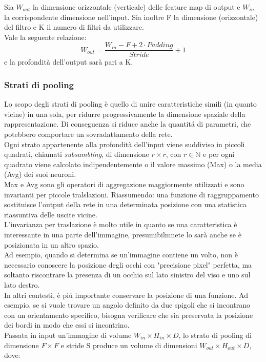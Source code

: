 \documentclass[a4paper,12pt]{report}
\begin{document}
Sia $W_{out}$ la dimensione orizzontale (verticale) delle feature map di output e $W_{in}$ la corrispondente dimensione nell'input. Sia inoltre F la dimensione (orizzontale) del filtro e K il numero di filtri da utilizzare.\\
Vale la seguente relazione:
\begin{equation}
W_{out}=\frac{W_{in} -F+2\cdot Padding}{Stride}+1
\end{equation}
e la profondit\`{a} dell'output sar\`{a} pari a K.
\newpage
\subsubsection{Strati di pooling}
Lo scopo degli strati di pooling \`e quello di unire caratteristiche simili (in quanto vicine) in una sola, per ridurre progressivamente la dimensione spaziale della rappresentazione. Di conseguenza si riduce anche la quantit\'{a} di parametri, che potebbero comportare un sovradattamento della rete.\\
Ogni strato appartenente alla profondit\`{a} dell'input viene suddiviso in piccoli quadrati, chiamati \textit{subsambling}, di dimensione  $r \times r$, con $r\in \mathbb{N}$ e  per ogni quadrato viene calcolato indipendentemente o il valore massimo (Max) o  la media (Avg) dei suoi neuroni.\\
Max e Avg sono gli operatori di aggregazione maggiormente utilizzati e sono invarianti per piccole tralslazioni. Riassumendo: una funzione di raggruppamento sostituisce l'output della rete in una determinata posizione con una statistica riassuntiva delle uscite vicine.\\
L'invarianza per traslazione \`e molto utile in quanto se una caratteristica \`e interessante in una parte dell'immagine, presumibilmnete lo sar\`{a} anche se \`e posizionata in un altro spazio.\\
Ad esempio, quando si determina se un'immagine contiene un volto, non \`e necessario conoscere la posizione degli occhi con "precisione pixel" perfetta, ma soltanto riscontrare la presenza di un occhio sul lato sinistro del viso e uno sul lato destro.\\
In altri contesti, \`e pi\'{u} importante conservare la posizione di una funzione. Ad esempio, se si vuole trovare un angolo definito da due spigoli che si incontrano con un orientamento specifico, bisogna verificare che sia preservata la posizione dei bordi in modo che essi si incontrino.\\
Passata in input un'immagine di volume $W_{in} \times H_{in} \times D$, lo strato di pooling di dimensione $F\times F$ e stride S produce un volume di dimensioni $W_{out} \times H_{out} \times D$, dove:
\end{document}
